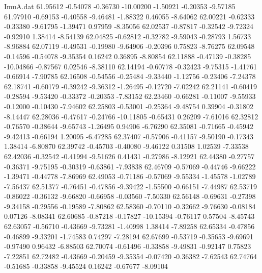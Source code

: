 \begin{filecontents}{ImuA.dat}
  61.95612   -0.54078   -0.36730  -10.00200   -1.50921   -0.20353   -9.57185
  61.97910   -0.69153   -0.40558   -9.46481   -1.88322    0.46055   -8.64062
  62.00221   -0.62333   -0.33380   -9.61795   -1.39471    0.97959   -8.35056
  62.02537   -0.87817   -0.32542   -9.72324   -0.92910    1.38414   -8.54139
  62.04825   -0.62812   -0.32782   -9.59043   -0.28793    1.56733   -8.96884
  62.07119   -0.49531   -0.19980   -9.64906   -0.20396    0.75823   -8.76275
  62.09548   -0.14596   -0.54078   -9.35354    0.16242    0.36895   -8.80854
  62.11888   -0.47139   -0.38285  -10.04866   -0.87567    0.02546   -8.38110
  62.14194   -0.60778   -0.32423   -9.75315   -1.41761   -0.66914   -7.90785
  62.16508   -0.54556   -0.25484   -9.33440   -1.12756   -0.23406   -7.24378
  62.18741   -0.60179   -0.39242   -9.36312   -1.26495   -0.12720   -7.02242
  62.21141   -0.60419   -0.28594   -9.53420   -0.33372   -0.20353   -7.83152
  62.23460   -0.66281   -0.11007   -9.55933   -0.12000   -0.10430   -7.94602
  62.25803   -0.53001   -0.25364   -9.48754    0.39904   -0.31802   -8.14447
  62.28036   -0.47617   -0.24766  -10.11805   -0.65431    0.26209   -7.61016
  62.32812   -0.76570   -0.38644   -9.65743   -1.26495    0.94906   -6.76290
  62.35081   -0.71665   -0.45942   -9.42413   -0.66194    1.20095   -6.47285
  62.37407   -0.57906   -0.41157   -9.50190   -0.17343    1.38414   -6.80870
  62.39742   -0.45703   -0.40080   -9.46122    0.31508    1.02539   -7.33538
  62.42036   -0.32542   -0.41994   -9.51626    0.41431   -0.27986   -8.12921
  62.44380   -0.27757   -0.36371   -9.75195   -0.30319   -0.63861   -7.93838
  62.46709   -0.57069   -0.44746   -9.66222   -1.39471   -0.44778   -7.86969
  62.49053   -0.71186   -0.57069   -9.55334   -1.45578   -1.02789   -7.56437
  62.51377   -0.76451   -0.47856   -9.39422   -1.55500   -0.66151   -7.44987
  62.53719   -0.86022   -0.36132   -9.66820   -0.66958   -0.03560   -7.50330
  62.56148   -0.69631   -0.27398   -9.34158   -0.29556   -0.19589   -7.80862
  62.58360   -0.70110   -0.32662   -9.76630   -0.08184    0.07126   -8.08341
  62.60685   -0.87218   -0.17827  -10.15394   -0.76117    0.57504   -8.45743
  62.63057   -0.56710   -0.43669   -9.73281   -1.40998    1.38414   -7.89258
  62.65334   -0.47856   -0.46899   -9.33201   -1.74583    0.74297   -7.28194
  62.67699   -0.53719   -0.35653   -9.69691   -0.97490    0.96432   -6.88503
  62.70074   -0.61496   -0.33858   -9.49831   -0.92147    0.75823   -7.22851
  62.72482   -0.43669   -0.20459   -9.35354   -0.07420   -0.36382   -7.62543
  62.74764   -0.51685   -0.33858   -9.45524    0.16242   -0.67677   -8.09104

\end{filecontents}
